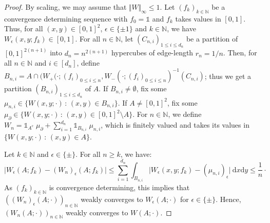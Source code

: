 \documentclass{amsart}
\theoremstyle{plain}
\theoremstyle{definition}
\newcommand{\TM}[1]{\norm{#1}_\infty}
\newcommand{\ind}{\mathds{1}}
\newcommand{\un}{\mathds{1}}
\newcommand{\N}{\mathbb{N}}
\newcommand{\drv}{\mathrm{d}}
\newcommand{\norm}[1]{\Vert#1\Vert}
\begin{document}
\begin{proof}
By scaling, we may assume that $\TM{W} \leq 1$.
Let $(f_k)_{k\in\N}$ be a convergence determining sequence
	with $f_0=\un$ and $f_k$ takes values in $[0,1]$.
Thus, for all $(x,y)\in [0,1]^2$, $\epsilon\in\{\pm 1\}$ and $k\in\N$, 
	we have $W_\epsilon(x,y;f_k) \in [0,1]$.
For all $n\in\N$, let $(C_{n,i})_{1\leq i\leq d_n}$ be a partition of $[0,1]^{2(n+1)}$
	into $d_n = n^{2(n+1)}$ hypercubes of edge-length $r_n = 1/n$.
Then, for all $n\in\N$ and $i\in [d_n]$,
	define $B_{n,i} = A \cap ( W_+(\cdot; (f_i)_{0\leq i\leq n},  W_-(\cdot; (f_i)_{0\leq i\leq n})^{-1}(C_{n,i})$;
	thus we get a partition $(B_{n,i})_{1\leq i\leq d_n}$ of $A$.
If $B_{n,i} \neq \emptyset$, fix some $\mu_{n,i} \in \{ W(x,y;\cdot) \, : \, (x,y)\in B_{n,i} \}$.
If $A\neq [0,1]^2$, fix some $\mu_{\partial} \in \{ W(x,y;\cdot) \, : \, (x,y)\in [0,1]^2 \setminus A \}$.
For $n\in\N$, we define 
	$W_n = \ind_{A^c}\; \mu_{\partial} + \sum_{i=1}^{d_n} \ind_{B_{n,i}}\; \mu_{n,i}$,
which is finitely valued and takes its values in $\{ W(x,y;\cdot) \, : \, (x,y)\in A \}$.

Let $k\in\N$ and $\epsilon\in\{\pm\}$. For all $n\geq k$, we have:
\begin{equation*}
\vert W_\epsilon(A;f_k) - (W_n)_\epsilon(A;f_k) \vert
\leq \sum_{i=1}^{d_n} \int_{B_{n,i}} \vert W_\epsilon(x,y;f_k) - (\mu_{n,i})_\epsilon \vert \ \drv x\drv y 
\leq \frac{1}{n} \cdot
\end{equation*}
As $(f_k)_{k\in\N}$ is convergence determining,
this implies that $((W_n)_\epsilon(A;\cdot))_{n\in\N}$ weakly converges to $W_\epsilon(A;\cdot)$ for $\epsilon\in\{\pm\}$.
Hence, $(W_n(A;\cdot))_{n\in\N}$ weakly converges to $W(A;\cdot)$.
\end{proof}
\end{document}
